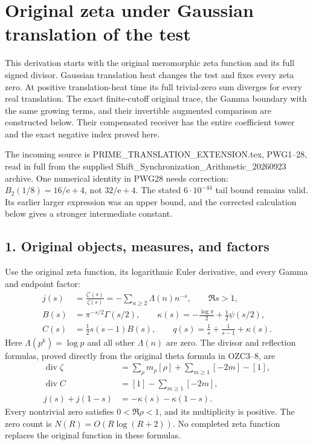 \documentclass[
  10pt,
  a4paper,
]{article}
\author{}
\date{}
\begin{document}
{
\setcounter{tocdepth}{3}
\tableofcontents
}
\section{Original zeta under Gaussian translation of the
test}\label{original-zeta-under-gaussian-translation-of-the-test}

This derivation starts with the original meromorphic zeta function and
its full signed divisor. Gaussian translation heat changes the test and
fixes every zeta zero. At positive translation-heat time its full
trivial-zero sum diverges for every real translation. The exact
finite-cutoff original trace, the Gamma boundary with the same growing
terms, and their invertible augmented comparison are constructed below.
Their compensated receiver has the entire coefficient tower and the
exact negative index proved here.

The incoming source is PRIME\_TRANSLATION\_EXTENSION.tex, PWG1--28, read
in full from the supplied Shift\_Synchronization\_Arithmetic\_20260923
archive. One numerical identity in PWG28 needs correction:
\(B_2(1/8)=16/\mathrm e+4\), not \(32/\mathrm e+4\). The stated
\(6\cdot10^{-44}\) tail bound remains valid. Its earlier larger
expression was an upper bound, and the corrected calculation below gives
a stronger intermediate constant.

\subsection{1. Original objects, measures, and
factors}\label{original-objects-measures-and-factors}

Use the original zeta function, its logarithmic Euler derivative, and
every Gamma and endpoint factor: \[
\begin{aligned}
j(s)&=\frac{\zeta'(s)}{\zeta(s)}
=-\sum_{n\ge2}\Lambda(n)n^{-s},\qquad \Re s>1,\\
B(s)&=\pi^{-s/2}\Gamma(s/2),\qquad
\kappa(s)=-\frac{\log\pi}{2}+\frac12\psi(s/2),\\
C(s)&=\tfrac12s(s-1)B(s),\qquad
q(s)=\frac1s+\frac1{s-1}+\kappa(s).
\end{aligned}
\tag{OZG1}
\] Here \(\Lambda(p^k)=\log p\) and all other \(\Lambda(n)\) are zero.
The divisor and reflection formulas, proved directly from the original
theta formula in OZC3--8, are \[
\begin{aligned}
\operatorname{div}\zeta
&=\sum_\rho m_\rho[\rho]+\sum_{m\ge1}[-2m]-[1],\\
\operatorname{div}C&=[1]-\sum_{m\ge1}[-2m],\\
j(s)+j(1-s)&=-\kappa(s)-\kappa(1-s).
\end{aligned}
\tag{OZG2}
\] Every nontrivial zero satisfies \(0<\Re\rho<1\), and its multiplicity
is positive. The zero count is \(N(R)=O(R\log(R+2))\). No completed zeta
function replaces the original function in these formulas.
\end{document}
